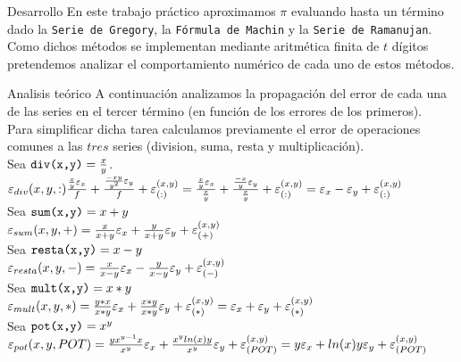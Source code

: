 \begin{section}{Desarrollo}
	En este trabajo práctico aproximamos $\pi$ evaluando hasta un término dado la \texttt{Serie de Gregory}, la \texttt{Fórmula de Machin} y la \texttt{Serie de Ramanujan}.
	Como dichos métodos se implementan mediante aritmética finita de $t$ dígitos pretendemos analizar el comportamiento numérico de cada uno de estos métodos.
	 
	\begin{subsection}{Analisis teórico}
		A continuación analizamos la propagación del error de cada una de las series en el tercer término (en función de los errores de los primeros).\\
		
		Para simplificar dicha tarea calculamos previamente el error de operaciones comunes a las $tres$ series (division, suma, resta y multiplicación).\\
		
		Sea $\texttt{div(x,y)}=\frac{x}{y}$.\\
		
		$\varepsilon _{div}({x,y,:}){\frac{\frac{x}{y}\varepsilon _{x}}{f} + \frac{\frac{-xy}{y^2}\varepsilon _{y}}{f} + \varepsilon _{({:})}^{({x,y})}} = 
		\frac{\frac{x}{y}\varepsilon _{x}}{\frac{x}{y}} + \frac{\frac{-x}{y}\varepsilon _{y}}{\frac{x}{y}} + \varepsilon _{({:})}^{({x,y})} = \varepsilon _{x} - \varepsilon _{y} + \varepsilon _{({:})}^{({x,y})}$\\
		
		Sea $\texttt{sum(x,y)}=x+y$\\
	
		$\varepsilon _{sum}({x,y,+}) = \frac{x}{x+y}\varepsilon _{x} + \frac{y}{x+y}\varepsilon _{y} + \varepsilon _{({+})}^{({x,y})}$\\
		
		Sea $\texttt{resta(x,y)}=x-y$\\
	
		$\varepsilon _{resta}({x,y,-}) = \frac{x}{x-y}\varepsilon _{x} - \frac{y}{x-y}\varepsilon _{y} + \varepsilon _{({-})}^{({x,y})}$\\
		
		Sea $\texttt{mult(x,y)}=x*y$\\
	
		$\varepsilon _{mult}({x,y,*}) = \frac{y*x}{x*y}\varepsilon _{x} + \frac{x*y}{x*y}\varepsilon _{y} + \varepsilon _{({*})}^{({x,y})} = \varepsilon _{x} + \varepsilon _{y} + \varepsilon _{({*})}^{({x,y})}$\\
		
		Sea $\texttt{pot(x,y)}=x^y$\\
		
		$\varepsilon _{pot}({x,y,POT}) = \frac{yx^{y-1}x}{x^y}\varepsilon _{x}+\frac{x^y ln(x) y}{x^y}\varepsilon _{y} + \varepsilon _{({POT})}^{({x,y})} = y\varepsilon _{x} + ln(x) y\varepsilon _{y} + \varepsilon _{({POT})}^{({x,y})}$\\
	

\end{subsection}
\end{section}

